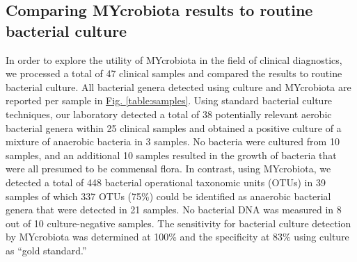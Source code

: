 \subsection*{Comparing MYcrobiota results to routine bacterial culture}
In order to explore the utility of MYcrobiota in the field of clinical diagnostics, we processed a total of 47 clinical samples and compared the results to routine bacterial culture. All bacterial genera detected using culture and MYcrobiota are reported per sample in \hyperref[table:samples]{Fig. \ref{table:samples}}. Using standard bacterial culture techniques, our laboratory detected a total of 38 potentially relevant aerobic bacterial genera within 25 clinical samples and obtained a positive culture of a mixture of anaerobic bacteria in 3 samples. No bacteria were cultured from 10 samples, and an additional 10 samples resulted in the growth of bacteria that were all presumed to be commensal flora. In contrast, using MYcrobiota, we detected a total of 448 bacterial operational taxonomic units (OTUs) in 39 samples of which 337 OTUs (75\%) could be identified as anaerobic bacterial genera that were detected in 21 samples. No bacterial DNA was measured in 8 out of 10 culture-negative samples. The sensitivity for bacterial culture detection by MYcrobiota was determined at 100\% and the specificity at 83\% using culture as “gold standard.”


